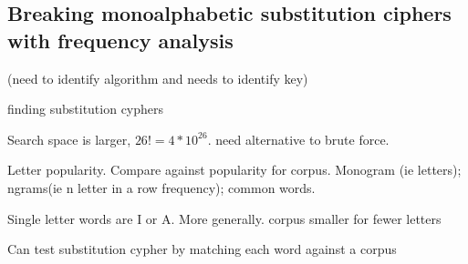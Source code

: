 
\subsection{Breaking monoalphabetic substitution ciphers with frequency analysis}

(need to identify algorithm and needs to identify key)

finding substitution cyphers

Search space is larger, \(26!=4*10^26\). need alternative to brute force.


Letter popularity. Compare against popularity for corpus. 
Monogram (ie letters); ngrams(ie n letter in a row frequency); common words.


Single letter words are I or A. More generally. corpus smaller for fewer letters

Can test substitution cypher by matching each word against a corpus


